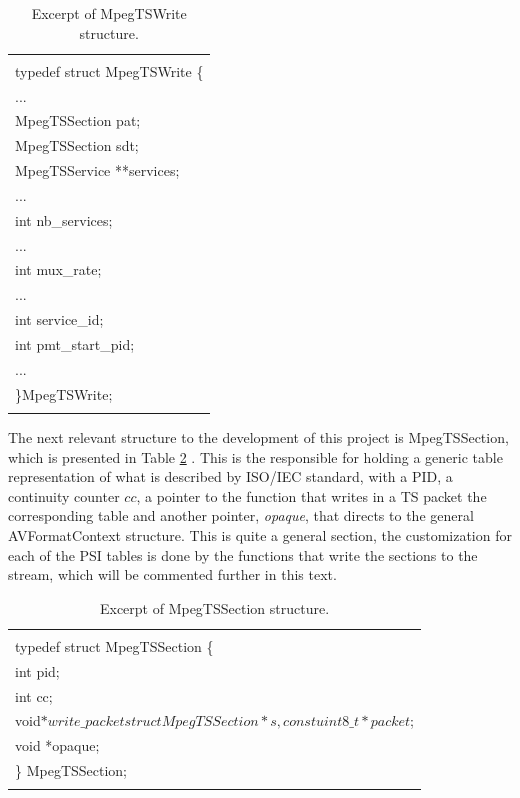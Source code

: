 \documentclass[
	12pt,				%
	openright,			%
	twoside,			%
	a4paper,			%
	brazil,
	french,				%
	english
	]{abntex2}
\begin{document}
\begin{table}[!htpd]
\label{tab_MpegTSWrite}
\caption{ Excerpt of MpegTSWrite structure.}
\begin{center}
\begin{tabular}{|l|}
\hline
\\
typedef struct MpegTSWrite \{\\
...\\
MpegTSSection pat;\\
MpegTSSection sdt;\\
MpegTSService **services;\\
...\\
int nb\_services;\\
...\\
int mux\_rate;\\
...\\
int service\_id;\\
int pmt\_start\_pid;\\
...\\
 \}MpegTSWrite;\\
 \\
\hline
\end{tabular}
\end{center}
\end{table}

The next relevant structure to the development of this project is MpegTSSection, which is presented in Table \ref{tab_MpegTSSection} . This is the responsible for holding a generic table representation of what is described by ISO/IEC standard, with a PID, a continuity counter \(\textit{cc}\), a pointer to the function that writes in a TS packet the corresponding table and another pointer, \textit{opaque}, that directs to the general AVFormatContext structure. This is quite a general section, the customization for each of the PSI tables is done by the functions that write the sections to the stream, which will be commented further in this text.

\begin{table}[!htpd]
\label{tab_MpegTSSection}
\caption{ Excerpt of MpegTSSection structure.}
\begin{center}
\begin{tabular}{|l|}
\hline
\\
typedef struct MpegTSSection \{\\
	int pid;\\
	int cc;\\
	void\(*write\_packet\)\(struct MpegTSSection *s, const uint8\_t *packet\);\\
	void *opaque;\\
\} MpegTSSection;\\
 \\
\hline
\end{tabular}
\end{center}
\end{table}
\end{document}
